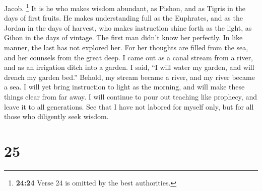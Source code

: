 Jacob.  \footnote{\textbf{24:24} Verse 24 is omitted by
  the best authorities.}  It is he who makes wisdom
abundant, as Pishon, and as Tigris in the days of first fruits.
 He makes understanding full as the Euphrates, and as the
Jordan in the days of harvest,  who makes instruction
shine forth as the light, as Gihon in the days of vintage.
 The first man didn't know her perfectly. In like manner,
the last has not explored her.  For her thoughts are
filled from the sea, and her counsels from the great deep.
 I came out as a canal stream from a river, and as an
irrigation ditch into a garden.  I said, ``I will water
my garden, and will drench my garden bed.'' Behold, my stream became a
river, and my river became a sea.  I will yet bring
instruction to light as the morning, and will make these things clear
from far away.  I will continue to pour out teaching like
prophecy, and leave it to all generations.  See that I
have not labored for myself only, but for all those who diligently seek
wisdom.

\hypertarget{section-21}{%
\section{25}\label{section-21}}


